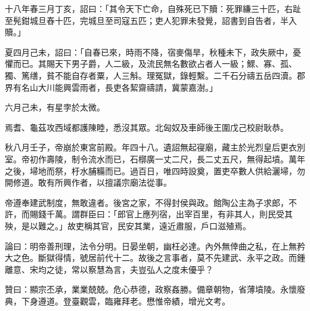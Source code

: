 \begin{pinyinscope}
十八年春三月丁亥，詔曰：「其令天下亡命，自殊死已下贖：死罪縑三十匹，右趾至髡鉗城旦舂十匹，完城旦至司寇五匹；吏人犯罪未發覺，詔書到自告者，半入贖。」

夏四月己未，詔曰：「自春已來，時雨不降，宿麥傷旱，秋種未下，政失厥中，憂懼而已。其賜天下男子爵，人二級，及流民無名數欲占者人一級；鰥、寡、孤、獨、篤缮，貧不能自存者粟，人三斛。理冤獄，錄輕繫。二千石分禱五岳四瀆。郡界有名山大川能興雲雨者，長吏各絜齋禱請，冀蒙嘉澍。」

六月己未，有星孛於太微。

焉耆、龜茲攻西域都護陳睦，悉沒其眾。北匈奴及車師後王圍戊己校尉耿恭。

秋八月壬子，帝崩於東宮前殿。年四十八。遺詔無起寑廟，藏主於光烈皇后更衣別室。帝初作壽陵，制令流水而已，石槨廣一丈二尺，長二丈五尺，無得起墳。萬年之後，埽地而祭，杅水脯糒而已。過百日，唯四時設奠，置吏卒數人供給灑埽，勿開修道。敢有所興作者，以擅議宗廟法從事。

帝遵奉建武制度，無敢違者。後宮之家，不得封侯與政。館陶公主為子求郎，不許，而賜錢千萬。謂群臣曰：「郎官上應列宿，出宰百里，有非其人，則民受其殃，是以難之。」故吏稱其官，民安其業，遠近肅服，戶口滋殖焉。

論曰：明帝善刑理，法令分明。日晏坐朝，幽枉必達。內外無倖曲之私，在上無矜大之色。斷獄得情，號居前代十二。故後之言事者，莫不先建武、永平之政。而鍾離意、宋均之徒，常以察慧為言，夫豈弘人之度未優乎？

贊曰：顯宗丕承，業業兢兢。危心恭德，政察姦勝。備章朝物，省薄墳陵。永懷廢典，下身遵道。登臺觀雲，臨雍拜老。懋惟帝績，增光文考。


\end{pinyinscope}